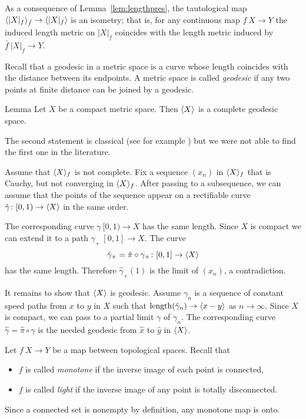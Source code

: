 \documentclass{article}
\begin{document}
As a consequence of Lemma~\ref{lem:lengthpres}, the tautological map $\<|X|_f\>_{\bar f}\zz\to \<|X|_f\>$ is an isometry;
that is, for any continuous map $f\:X\to Y$ the induced length metric on $|X|_f$ coincides with the length metric induced by 
$\bar f\:|X|_f\to Y$.


Recall that a geodesic in a metric space is a curve whose length coincides with the distance between its endpoints.
A metric space is called \emph{geodesic} if any two points at finite distance can be joined by a geodesic.

\begin{thm}{Lemma}\label{lem:geospace}
Let $X$ be a compact metric space. 
Then $\langle X\rangle$ is a complete geodesic space.
\end{thm}

The second statement is classical (see for example \cite[II-\S8 Thm. 3]{KF}) but 
we were not able to find the first one in the literature.

Assume that $\langle X\rangle_f$ is not complete.
Fix a sequence $(x_n)$ in $\langle X\rangle_f$ that is Cauchy, but not converging in $\langle X\rangle_f$.
After passing to a subsequence, we can assume that the points of the sequence appear on a rectifiable curve $\hat\gamma\colon[0,1)\to\langle X\rangle$ in the same order.

The corresponding curve $\gamma\:[0,1)\to X$ has the same length.
Since $X$ is compact we can extend it to a path $\gamma_+\:[0,1]\to X$.
The curve 
\[\hat\gamma_+=\hat\pi\circ\gamma_+\colon[0,1]\to\langle X\rangle\]
has the same length.
Therefore $\hat\gamma_+(1)$ is the limit of $(x_n)$, a contradiction.

It remains to show that $\langle X\rangle$ is geodesic.
Assume $\gamma_n$ is a sequence of constant speed paths from $x$ to $y$ in $X$
such that $\mathop{\rm length}\nolimits(\hat\gamma_n)\to \langle x-y\rangle$ as $n\to\infty$.
Since $X$ is compact, we can pass to a partial limit $\gamma$ of  $\gamma_n$.
The corresponding curve $\hat\gamma=\hat \pi\circ\gamma$ is the needed geodesic from $\hat x$ to $\hat y$ in $\langle X\rangle$.
\qeds

Let $f\:X\to Y$ be a map between topological spaces.
Recall that 
\begin{itemize}
\item $f$ is called \emph{monotone} if the inverse image of each point is connected,
 \item $f$ is called \emph{light} if the inverse image of any point is totally disconnected.
\end{itemize}
Since a connected set is nonempty by definition, any monotone map is onto.
\end{document}
